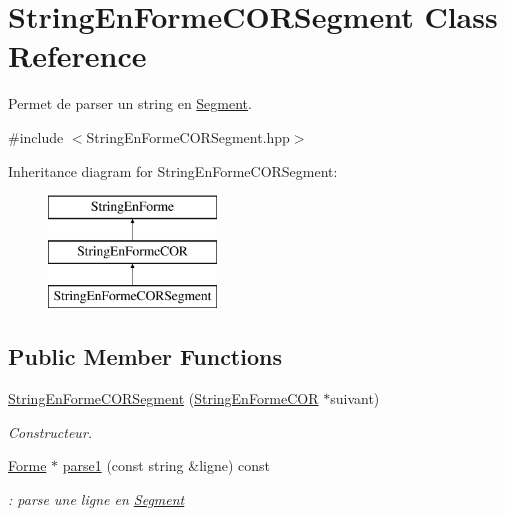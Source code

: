\hypertarget{class_string_en_forme_c_o_r_segment}{}\section{String\+En\+Forme\+C\+O\+R\+Segment Class Reference}
\label{class_string_en_forme_c_o_r_segment}


Permet de parser un string en \mbox{\hyperlink{class_segment}{Segment}}.  




{\ttfamily \#include $<$String\+En\+Forme\+C\+O\+R\+Segment.\+hpp$>$}

Inheritance diagram for String\+En\+Forme\+C\+O\+R\+Segment\+:\begin{figure}[H]
\begin{center}
\leavevmode
\includegraphics[height=3.000000cm]{class_string_en_forme_c_o_r_segment}
\end{center}
\end{figure}
\subsection*{Public Member Functions}
\begin{DoxyCompactItemize}
\item 
\mbox{\hyperlink{class_string_en_forme_c_o_r_segment_abf4e663d45a8515af8a668ba99c5859f}{String\+En\+Forme\+C\+O\+R\+Segment}} (\mbox{\hyperlink{class_string_en_forme_c_o_r}{String\+En\+Forme\+C\+OR}} $\ast$suivant)
\begin{DoxyCompactList}\small\item\em Constructeur. \end{DoxyCompactList}\item 
\mbox{\hyperlink{class_forme}{Forme}} $\ast$ \mbox{\hyperlink{class_string_en_forme_c_o_r_segment_a89b4c233c5c4f5ccc17f9f993a6a6dbc}{parse1}} (const string \&ligne) const
\begin{DoxyCompactList}\small\item\em \+: parse une ligne en \mbox{\hyperlink{class_segment}{Segment}} \end{DoxyCompactList}\end{DoxyCompactItemize}


